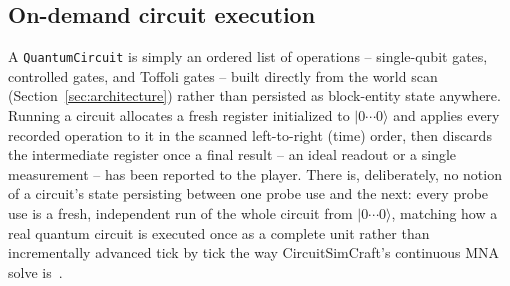 \subsection{On-demand circuit execution}

A \texttt{QuantumCircuit} is simply an ordered list of operations -- single-qubit gates,
controlled gates, and Toffoli gates -- built directly from the world scan
(Section~\ref{sec:architecture}) rather than persisted as block-entity state anywhere. Running
a circuit allocates a fresh register initialized to $|0\cdots0\rangle$ and applies every
recorded operation to it in the scanned left-to-right (time) order, then discards the
intermediate register once a final result -- an ideal readout or a single measurement -- has
been reported to the player. There is, deliberately, no notion of a circuit's state persisting
between one probe use and the next: every probe use is a fresh, independent run of the whole
circuit from $|0\cdots0\rangle$, matching how a real quantum circuit is executed once as a
complete unit rather than incrementally advanced tick by tick the way CircuitSimCraft's
continuous MNA solve is~\cite{picos2026circuitsimcraft}.
